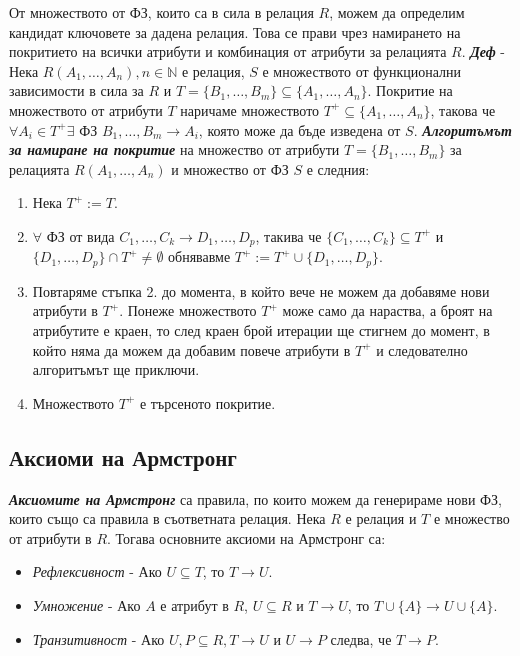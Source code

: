 \documentclass[fleqn,12pt]{article}
\begin{document}
От множеството от ФЗ, които са в сила в релация $R$, можем да определим кандидат ключовете за дадена релация.
Това се прави чрез намирането на покритието на всички атрибути и комбинация от атрибути за релацията $R$.
\bigbreak
\textbf{\textit{Деф}} - Нека $R(A_1, \dots, A_n), n \in \mathbb{N}$ е релация, $S$ е множеството от функционални зависимости в сила за $R$ и $T = \{B_1, \dots, B_m\} \subseteq \{A_1, \dots, A_n\}$.
Покритие на множеството от атрибути $T$ наричаме множеството $T^{+} \subseteq \{A_1, \dots, A_n\}$, такова че $\forall A_i \in T^{+} \exists$ ФЗ $B_1, \dots, B_m \rightarrow A_i$, която може да бъде изведена от $S$.
\bigbreak
\textbf{\textit{Алгоритъмът за намиране на покритие}} на множество от атрибути $T = \{B_1, \dots, B_m\}$ за релацията $R(A_1, \dots, A_n)$ и множество от ФЗ $S$ е следния:
\begin{enumerate}
    \item Нека $T^{+} := T$.
    \item $\forall$ ФЗ от вида $C_1, \dots, C_k \rightarrow D_1, \dots, D_p$, такива че $\{C_1, \dots, C_k\} \subseteq T^{+}$ и $\{D_1, \dots, D_p\} \cap T^{+} \neq \emptyset$ обнявавме $T^{+} := T^{+} \cup \{D_1, \dots, D_p\}$.
    \item Повтаряме стъпка 2. до момента, в който вече не можем да добавяме нови атрибути в $T^{+}$.
    Понеже множеството $T^{+}$ може само да нараства, а броят на атрибутите е краен, то след краен брой итерации ще стигнем до момент, в който няма да можем да добавим повече атрибути в $T^{+}$ и следователно алгоритъмът ще приключи.
    \item Множеството $T^{+}$ е търсеното покритие.
\end{enumerate}

\subsection{Аксиоми на Армстронг}

\textbf{\textit{Аксиомите на Армстронг}} са правила, по които можем да генерираме нови ФЗ, които също са правила в съответната релация.
Нека $R$ е релация и $T$ е множество от атрибути в $R$.
Тогава основните аксиоми на Армстронг са:
\begin{itemize}
    \item \textit{Рефлексивност} - Ако $U \subseteq T$, то $T \rightarrow U$.
    \item \textit{Умножение} - Ако $A$ е атрибут в $R$, $U \subseteq R$ и $T \rightarrow U$, то $T \cup \{A\} \rightarrow U \cup \{A\}$.
    \item \textit{Транзитивност} - Ако $U, P \subseteq R, T \rightarrow U$ и $U \rightarrow P$ следва, че $T \rightarrow P$.
\end{itemize}
\end{document}
